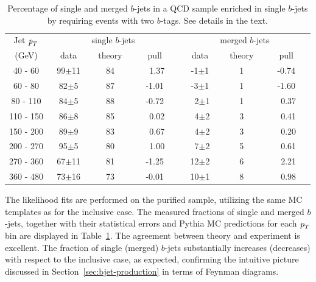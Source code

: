 \begin{table}[!hbt] %
\renewcommand{\arraystretch}{1.2}
\centering
\begin{tabular}{ | c || c | c | c || c | c | c ||}
  \hline
  Jet ${\emph{p}_{T}}$ & \multicolumn{3}{c||}{single $b$-jets}& \multicolumn{3}{c||}{merged $b$-jets}\\ \cline{2-7}
    (GeV) & ~~data~~ & ~theory~ & ~~~pull~~~& ~~data~~ & ~theory~ & ~~~pull~~~\\ \hline
   40 - 60 &  99$\pm$11 & 84   & ~1.37&  -1$\pm$1& 1 &-0.74 \\  
   60 - 80 &  82$\pm$5  &  87  & -1.01&  -3$\pm$1& 1 &-1.60 \\ 
   80 - 110&  84$\pm$5  &  88 &  -0.72&  ~2$\pm$1& 1 &~0.37 \\ 
  110 - 150&  86$\pm$8  &  85 &  ~0.02&  ~4$\pm$2& 3 &~0.41 \\ 
  150 - 200&  89$\pm$9  &  83 &  ~0.67&  ~4$\pm$2& 3 &~0.20 \\ 
  200 - 270&  95$\pm$5  &  80 &  ~1.00&  ~7$\pm$2& 5 &~0.61 \\ 
  270 - 360&  67$\pm$11  &  81 & -1.25&  12$\pm$2& 6 &~2.21 \\ 
  360 - 480&  73$\pm$16  &  73 & -0.01&  10$\pm$1& 8 &~0.98 \\ \hline
\end{tabular}
\caption{Percentage of single  and merged $b$-jets in a QCD sample enriched in single $b$-jets by requiring events with two $b$-tags. See details in the text.} %
\label{tb:fitfractions2btagS}
\end{table}
The likelihood fits are performed on the purified sample, utilizing the same MC templates as for the inclusive case.
The measured fractions of single and merged $b$-jets, together with their statistical errors and {\sc Pythia} MC predictions for each ${\emph{p}_{T}}$ bin are displayed in Table~\ref{tb:fitfractions2btagS}. The agreement between theory and experiment is excellent. The fraction of single (merged) $b$-jets substantially increases (decreases) with respect to the inclusive case, as expected, confirming the intuitive picture discussed in Section~\ref{sec:bjet-production} in terms of Feynman diagrams.


